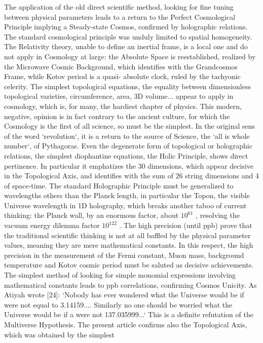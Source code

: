 \documentclass[twoside,draft]{article}
\begin{document}
{The application of the old direct scientific method, looking for fine tuning between physical
parameters leads to a return to the Perfect Cosmological Principle implying a Steady-state Cosmos,
confirmed by holographic relations. The standard cosmological principle was unduly limited to
spatial homogeneity. The Relativity theory, unable to define an inertial frame, is a local one and do
not apply in Cosmology at large: the Absolute Space is reestablished, realized by the Microwave
Cosmic Background, which identifies with the Grandcosmos Frame, while Kotov period is a quasi-
absolute clock, ruled by the tachyonic celerity.
The simplest topological equations, the equality between dimensionless topological varieties,
circumference, area, 3D volume... appear to apply in cosmology, which is, for many, the hardiest
chapter of physics. This modern, negative, opinion is in fact contrary to the ancient culture, for
which the Cosmology is the first of all science, so must be the simplest. In the original sens of the
word `revolution`, it is a return to the source of Science, the `all is whole number`, of Pythagoras.
Even the degenerate form of topological or holographic relations, the simplest diophantine
equations, the Holic Principle, shows direct pertinence. In particular it emphatizes the 30
dimensions, which appear decisive in the Topological Axis, and identifies with the sum of 26 string
dimensions and 4 of space-time.
The standard Holographic Principle must be generalized to wavelengths others than the Planck
length, in particular the Topon, the visible Universe wavelength in 1D holography, which breaks
another taboo of current thinking: the Planck wall, by an enormous factor, about $10^{61}$ , resolving the
vacuum energy dilemma factor $10^{122}$ .
The high precision (until ppb) prove that the traditional scientific thinking is not at all baffled by
the physical parameter values, meaning they are mere mathematical constants. In this respect, the
high precision in the measurement of the Fermi constant, Muon mass, background temperature and
Kotov cosmic period must be saluted as decisive achievements.
The simplest method of looking for simple monomial expressions involving mathematical
constants leads to ppb correlations, confirming Cosmos Unicity. As Atiyah wrote [24]: `Nobody has
ever wondered what the Universe would be if \pi were not equal to 3.14159.... Similarly no one
should be worried what the Universe would be if a were not 137.035999...` This is a definite
refutation of the Multiverse Hypothesis.
The present article confirms also the Topological Axis, which was obtained by the simplest
}
\end{document}
